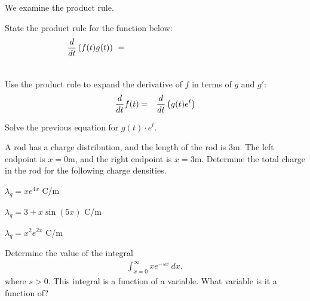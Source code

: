 
\begin{problem}
  \item We examine the product rule.
  \begin{subproblem}
    \item   State the product rule for the function below:
  \begin{eqnarray*}
    \lefteqn{\frac{d}{dt} \lp f(t) g(t) \rp  ~ = } \hspace{20em} \\
    & &
  \end{eqnarray*}
  \item Use the product rule to expand the derivative of $f$ in terms of
      $g$ and $g'$:
      \begin{eqnarray*}
        \frac{d}{dt} f(t) & = &  \frac{d}{dt} \left( g(t) e^t \right)
      \end{eqnarray*}
      \vfill
  \item   Solve the previous equation for $g(t) \cdot e^t$.
  \vfill
\end{subproblem}
\end{problem}



\begin{problem}
\item A rod has a charge distribution, and the length of the rod is
  3m. The left endpoint is $x=0$m, and the right endpoint is
  $x=3$m. Determine the total charge in the rod for the following
  charge densities.
  \begin{subproblem}
    \item $\lambda_q = xe^{4x}$ C/m
      \vfill
    \item $\lambda_q = 3+x\sin(5x)$ C/m
      \vfill
      \clearpage
    \item $\lambda_q = x^2 e^{2x} $ C/m
      \vfill
  \end{subproblem}
  \item  Determine the value of the integral
  \begin{eqnarray*}
    \int_{x=0}^\infty x e^{-sx} ~ dx,
  \end{eqnarray*}
  where $s>0$.
  This integral is a function of a variable. What variable is it a function of?
  \vfill
\end{problem}

